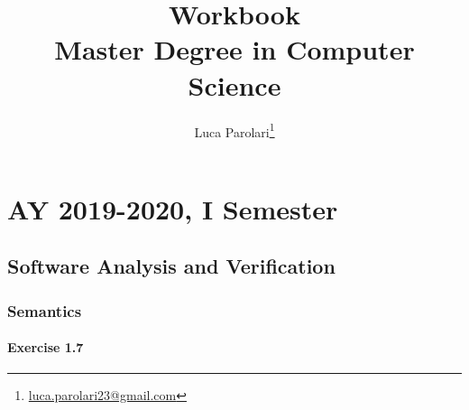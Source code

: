 \documentclass[12pt,a4paper,oneside]{book}
\title{Workbook \\ Master Degree in Computer Science}
\author{Luca Parolari\footnote{\href{mailto:luca.parolari23@gmail.com}{luca.parolari23@gmail.com}}}
\begin{document}
\maketitle
\tableofcontents

\part{AY 2019-2020, I Semester}

\chapter{Software Analysis and Verification}

\section{Semantics}

\subsection{Exercise 1.7}
\end{document}
